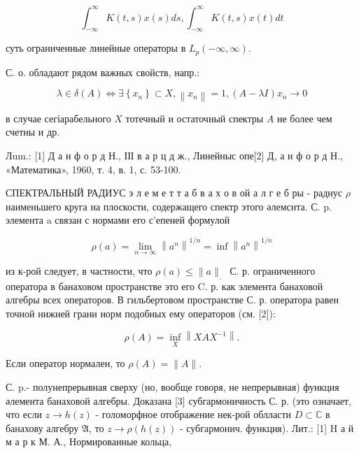 \documentclass[10pt]{article}
\begin{document}
\[

\int_{-\infty}^{\infty} K(t, s) x(s) d s, \int_{-\infty}^{\infty} K(t, s) x(t) d t

\]



суть ограниченные линейные операторы в $L_{p}(-\infty, \infty)$.



С. о. обладают рядом важных свойств, напр.:



\[

\lambda \in \delta(A) \Leftrightarrow \exists\left\{x_{n}\right\} \subset X,\left\|x_{n}\right\|=1,(A-\lambda I) x_{n} \rightarrow 0

\]



в случае сегіарабельного $X$ тотечный и остаточный спектры $A$ не более чем счетны и др.



Лum.: [1] Д а н ф о р д Н., ІІІ в а р ц д ж., Линейныс опе[2] Д, а н ф о р д Н., «Математика», 1960, т. 4, в. 1, с. 53-100.



СПЕКТРАЛЬНЫЙ РАДИУС э л е м е т т а б в $а$ х о в ой а л г е б ры - раднус $\rho$ наименьшего круга на плоскости, содержащего спектр этого әлемснта. С. p. элемента a связан с нормами его с'епеней формулой



\[

\rho(a)=\lim _{n \rightarrow \infty}\left\|a^{n}\right\|^{1 / n}=\inf \left\|a^{n}\right\|^{1 / n}

\]



из к-рой следует, в частности, что $\rho(a) \leqslant\|a\|_{\text {. }}$ С. р. ограниченного оператора в банаховом пространстве это его C. р. как элемента банаховой алгебры всех операторов. В гильбертовом пространстве С. р. оператора равен точной нижней грани норм подобных ему операторов (см. [2]):



\[

\rho(A)=\inf _{X}\left\|X A X^{-1}\right\| .

\]



Если оператор нормален, то $\rho(A)=\|A\|$.



С. p.- полунепрерывная сверху (но, вообще говоря, не непрерывная) функция әлемента банаховой алгебры. Доказана [3] субгармоничность С. р. (это означает, что если $z \rightarrow h(z)$ - голоморфное отображение нек-рой облласти $D \subset \mathbb{C}$ в банахову алгебру $\mathfrak{A}$, то $z \rightarrow \rho(h(z))$ - субгармонич. функция). Лит.: [1] H а й м а р к М. А., Нормированные кольца,
\end{document}
